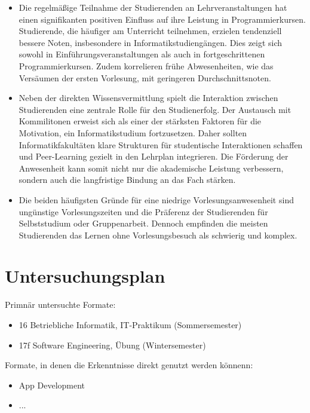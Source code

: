 \documentclass{article}
\begin{document}
\begin{itemize}
    \item Die regelmäßige Teilnahme der Studierenden an Lehrveranstaltungen hat einen signifikanten positiven Einfluss auf ihre Leistung in Programmierkursen. Studierende, die häufiger am Unterricht teilnehmen, erzielen tendenziell bessere Noten, insbesondere in Informatikstudiengängen. Dies zeigt sich sowohl in Einführungsveranstaltungen als auch in fortgeschrittenen Programmierkursen. Zudem korrelieren frühe Abwesenheiten, wie das Versäumen der ersten Vorlesung, mit geringeren Durchschnittsnoten.
    \item Neben der direkten Wissensvermittlung spielt die Interaktion zwischen Studierenden eine zentrale Rolle für den Studienerfolg. Der Austausch mit Kommilitonen erweist sich als einer der stärksten Faktoren für die Motivation, ein Informatikstudium fortzusetzen. Daher sollten Informatikfakultäten klare Strukturen für studentische Interaktionen schaffen und Peer-Learning gezielt in den Lehrplan integrieren. Die Förderung der Anwesenheit kann somit nicht nur die akademische Leistung verbessern, sondern auch die langfristige Bindung an das Fach stärken.
    \item Die beiden häufigsten Gründe für eine niedrige Vorlesungsanwesenheit sind ungünstige Vorlesungszeiten und die Präferenz der Studierenden für Selbststudium oder Gruppenarbeit. Dennoch empfinden die meisten Studierenden das Lernen ohne Vorlesungsbesuch als schwierig und komplex.
\end{itemize}



\section{Untersuchungsplan}

Primnär untersuchte Formate:
\begin{itemize}
    \item 16 Betriebliche Informatik, IT-Praktikum (Sommersemester)
    \item 17f Software Engineering, Übung (Wintersemester)
\end{itemize}

Formate, in denen die Erkenntnisse direkt genutzt werden könnenn:
\begin{itemize}
    \item App Development
    \item ...
\end{itemize}






\printbibliography
\end{document}

